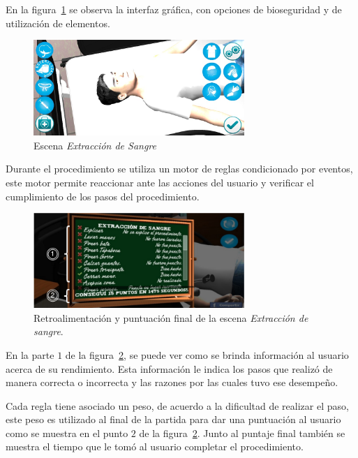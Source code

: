 En la figura~\ref{fig:hemocultivo_gui} se observa la interfaz gráfica, con
opciones de bioseguridad y de utilización de elementos.

\begin{figure}[H]
\centering
\includegraphics[width=8cm]{../solucion/images/hemocultivo_gui.jpg}
\caption{Escena \emph{Extracción de Sangre}}
\label{fig:hemocultivo_gui}
\end{figure}

Durante el procedimiento se utiliza un motor de reglas condicionado por
eventos\cite{bailey2004event,behrends2006combining}, este motor permite
reaccionar ante las acciones del usuario y verificar el cumplimiento de los
pasos del procedimiento. 

\begin{figure}[H]
\centering 
\includegraphics[width=8cm]{../solucion/images/hemocultivo_retroalimentacion.jpg}
\caption{Retroalimentación y puntuación final de la escena \emph{Extracción de
        sangre}.}
\label{fig:hemocultivo_retroalimentacion}
\end{figure}

En la parte $1$ de la figura~\ref{fig:hemocultivo_retroalimentacion}, se puede
ver como se brinda información al  usuario acerca de su rendimiento. Esta
información le indica los pasos que realizó de manera correcta o incorrecta y
las razones por las cuales tuvo ese desempeño.

Cada regla tiene asociado un peso, de acuerdo a la dificultad de realizar el
paso, este peso es utilizado al final de la partida para dar una puntuación al
usuario como se muestra en el punto $2$ de la
figura~\ref{fig:hemocultivo_retroalimentacion}. Junto al puntaje final también
se muestra el tiempo que le tomó al usuario completar el procedimiento.

